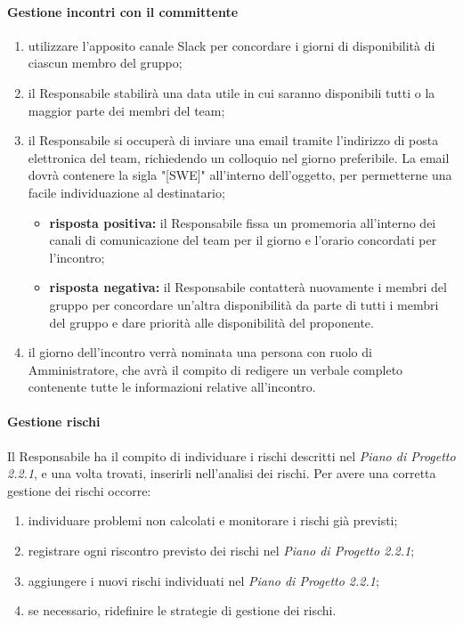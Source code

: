 	\paragraph{Gestione incontri con il committente}
	\begin{enumerate}
		\item utilizzare l'apposito canale Slack per concordare i giorni di disponibilità di ciascun membro del gruppo;
		\item il Responsabile stabilirà una data utile in cui saranno disponibili tutti o la maggior parte dei membri del team;
		\item il Responsabile si occuperà di inviare una email tramite l'indirizzo di posta elettronica del team, richiedendo un colloquio nel giorno preferibile. La email dovrà contenere la sigla "[SWE]" all'interno dell'oggetto, per permetterne una facile individuazione al destinatario;
		\begin{itemize}
			\item \textbf{risposta positiva:} il Responsabile fissa un promemoria all'interno dei canali di comunicazione del team per il giorno e l'orario concordati per l'incontro;
			\item \textbf{risposta negativa:} il Responsabile contatterà nuovamente i membri del gruppo per concordare un'altra disponibilità da parte di tutti i membri del gruppo e dare priorità alle disponibilità del proponente.
		\end{itemize}
		\item il giorno dell'incontro verrà nominata una persona con ruolo di Amministratore, che avrà il compito di redigere un verbale completo contenente tutte le informazioni relative all'incontro.
	\end{enumerate}

	\paragraph{Gestione rischi}
	Il Responsabile ha il compito di individuare i rischi descritti nel \textit{Piano di Progetto 2.2.1\docs}, e una volta trovati, inserirli nell'analisi dei rischi. Per avere una corretta gestione dei rischi occorre:
	\begin{enumerate}
		\item individuare problemi non calcolati e monitorare i rischi già previsti;
		\item registrare ogni riscontro previsto dei rischi nel \textit{Piano di Progetto 2.2.1\docs};
		\item aggiungere i nuovi rischi individuati nel \textit{Piano di Progetto 2.2.1\docs};
		\item se necessario, ridefinire le strategie di gestione dei rischi.
	\end{enumerate}  	


